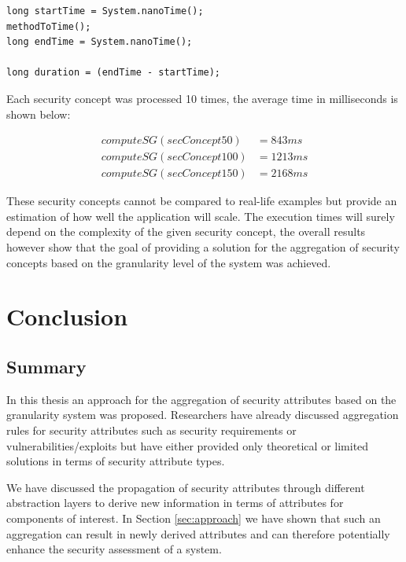 \begin{minipage}{\linewidth}
\begin{lstlisting}[floatplacement=H,caption=Execution time in nanoseconds ,label=code1,basicstyle=\scriptsize]
long startTime = System.nanoTime();
methodToTime();
long endTime = System.nanoTime();

long duration = (endTime - startTime);
\end{lstlisting}
\end{minipage}

Each security concept was processed 10 times, the average time in milliseconds is shown below:

\begin{align*}
computeSG(secConcept50) &= 843ms \\
computeSG(secConcept100) &= 1213ms \\
computeSG(secConcept150) &= 2168ms
\end{align*} 

These security concepts cannot be compared to real-life examples but provide an estimation of how well the application will scale. The execution times will surely depend on the complexity of the given security concept, the overall results however show that the goal of providing a solution for the aggregation of security concepts based on the granularity level of the system was achieved.

\section{Conclusion}
\label{sec:conclusion}

\subsection{Summary}

In this thesis an approach for the aggregation of security attributes based on the granularity system was proposed. Researchers have already discussed aggregation rules for security attributes such as security requirements \cite{Menzel2008} or vulnerabilities/exploits \cite{Noel:2004:MAG:1029208.1029225} but have either provided only theoretical or limited solutions in terms of security attribute types. 

We have discussed the propagation of security attributes through different abstraction layers to derive new information in terms of attributes for components of interest. In Section \ref{sec:approach} we have shown that such an aggregation can result in newly derived attributes and can therefore potentially enhance the security assessment of a system.

